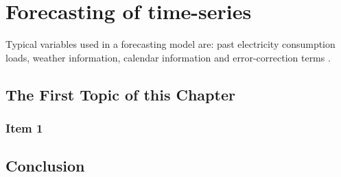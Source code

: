\chapter{Forecasting of time-series}
\label{cha:4}

 Typical variables used in a forecasting model are: past electricity consumption loads, weather information, calendar information and error-correction terms \cite{loadforecastingmoor}.
 
\section{The First Topic of this Chapter}
\subsection{Item 1}



\section{Conclusion}


